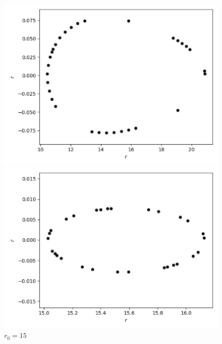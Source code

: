 \documentclass[10pt,a4paper]{report}
\begin{document}
\begin{figure}[!ht]
\begin{minipage}[b]{0.5\linewidth}
\centering
\includegraphics[width=\textwidth]{3b/r0=10,E=0.97,L=4.png}
\caption{$r_0=10$}
\label{fig:figure1}
\end{minipage}
\hspace{0.5cm}
\begin{minipage}[b]{0.5\linewidth}
\centering
\includegraphics[width=\textwidth]{3b/r0=15,E=0.97,L=4.png}
\caption{$r_0=15$}
\label{fig:figure2}
\end{minipage}
\end{figure}
\end{document}
